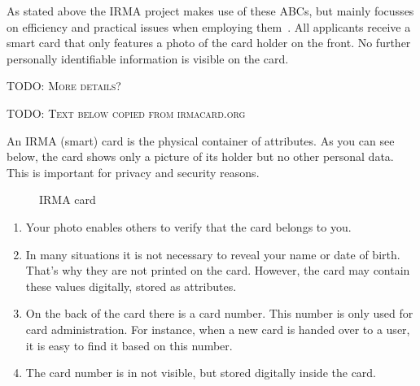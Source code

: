 As stated above the IRMA project makes use of these ABCs, but mainly focusses on efficiency and practical issues when employing them~\cite{abcofabc}. All applicants receive a smart card that only features a photo of the card holder on the front. No further personally identifiable information is visible on the card.

\textsc{TODO: More details?}

\textsc{TODO: Text below copied from irmacard.org}

An IRMA (smart) card is the physical container of attributes. As you can see below, the card shows only a picture of its holder but no other personal data. This is important for privacy and security reasons.

\begin{figure}[!ht]
  \centering
  \caption{IRMA card}
  \label{fig:dummy}
\end{figure}

\begin{enumerate}
	\item Your photo enables others to verify that the card belongs to you.
  \item In many situations it is not necessary to reveal your name or date of birth. That’s why they are not printed on the card. However, the card may contain these values digitally, stored as attributes.
  \item On the back of the card there is a card number. This number is only used for card administration. For instance, when a new card is handed over to a user, it is easy to find it based on this number.
  \item The card number is in not visible, but stored digitally inside the card.
\end{enumerate}


